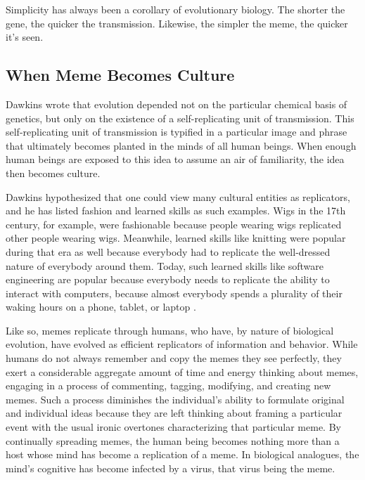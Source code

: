 \documentclass[12pt,letterpaper]{article}
\begin{document}
Simplicity has always been a corollary of evolutionary biology.  The shorter the gene, the quicker the transmission.  Likewise, the simpler the meme, the quicker it's seen.

\subsection{When Meme Becomes Culture}
Dawkins wrote that evolution depended not on the particular chemical basis of genetics, but only on the existence of a self-replicating unit of transmission.  This self-replicating unit of transmission is typified in a particular image and phrase that ultimately becomes planted in the minds of all human beings.  When enough human beings are exposed to this idea to assume an air of familiarity,  the idea then becomes culture.

Dawkins hypothesized that one could view many cultural entities as replicators, and he has listed fashion and learned skills as such examples.  Wigs in the 17th century, for example, were fashionable because people wearing wigs replicated other people wearing wigs.  Meanwhile, learned skills like knitting were popular during that era as well because everybody had to replicate the well-dressed nature of everybody around them.  Today, such learned skills like software engineering are popular because everybody needs to replicate the ability to interact with computers, because almost everybody spends a plurality of their waking hours on a phone, tablet, or laptop \cite{}.


Like so, memes replicate through humans, who have, by nature of biological evolution, have evolved as efficient replicators of information and behavior. While humans do not always remember and copy the memes they see perfectly, they exert a considerable aggregate amount of time and energy thinking about memes, engaging in a process of commenting, tagging, modifying, and creating new memes.  Such a process diminishes the individual's ability to formulate original and individual ideas because they are left thinking about framing a particular event with the usual ironic overtones characterizing that particular meme.  By continually spreading memes, the human being becomes nothing more than a host whose mind has become a replication of a meme.  In biological analogues, the mind's cognitive has become infected by a virus, that virus being the meme.
\end{document}
